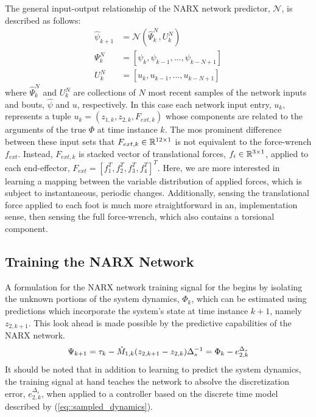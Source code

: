 The general input-output relationship of the NARX network predictor, $\mathscr{N}$, is described as follows:
	\begin{equation}
		\begin{split}
		\hat{\psi}_{k+1}&= \mathscr{N}(\hat{\Psi}_{k}^{N},{U}_{k}^{N}) \\
		{\Psi}_{k}^{N}	&= [\psi_{k},\psi_{k-1},...,\psi_{k-N+1}]  \\
		{U}_{k}^{N}		&= [u_{k}   ,u_{k-1}   ,...,u_{k-N+1}   ]
		\end{split}
		\label{eq::narx_model}
	\end{equation}
where $\hat{\Psi}_{k}^{N}$ and ${U}_{k}^{N}$ are collections of $N$ most recent samples of the network inputs and bouts, $\hat{\psi}$ and $u$, respectively. 
In this case each network  input entry, $u_{k}$, represents a tuple $u_{k} = (z_{1,k}, z_{2,k}, F_{ext,k})$ whose components are related to the 
arguments of the true $\Phi$ at time instance $k$. The mos prominent difference between these input sets that $F_{ext,k} \in \mathbb{R}^{12\times1} $ is not equivalent to the
force-wrench $f_{ext}$. Instead, $F_{ext,k}$ is stacked vector of translational forces, $f_{i}\in \mathbb{R}^{3\times1}$, applied to each \Ith end-effector, \IE 
$F_{ext} = [ f_{1}^{T}, f_{2}^{T}, f_{3}^{T}, f_{4}^{T} ]^T$. Here, we are more interested in learning a mapping between the variable distribution
of applied forces, which is subject to instantaneous, periodic changes. Additionally, sensing the translational force applied to each foot is much
more straightforward in an, implementation sense, then sensing the full force-wrench, which also contains a torsional component.


\subsection{Training the NARX Network}
	

A formulation for the  NARX network training signal for the begins by isolating the unknown portions of the system dynamics, $\Phi_{k}$, 
which can be estimated using predictions which incorporate the system's state at time instance $k+1$, namely ${z}_{2,k+1}$. This look ahead is made 
possible by the predictive capabilities of the NARX network.
	\begin{equation}
		\Psi_{k+1} = \tau_{k} - \hat{M}_{1,k}({z}_{2,k+1} - {z}_{2,k})\Delta_{s}^{-1} = \Phi_{k} - {e}_{2,k}^{\Delta_{s}} \\
		\label{eq::training_signal}
	\end{equation}
It should be noted that in addition to learning to predict the system dynamics, the training signal at hand teaches the network to absolve
the discretization error, ${e}_{2,k}^{\Delta_{s}}$, when applied to a controller based on the discrete time model described by (\ref{eq::sampled_dynamics}).

